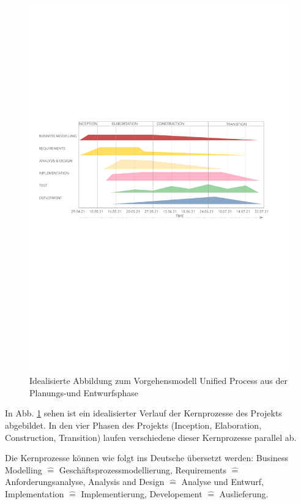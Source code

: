 \documentclass[../review_3.tex]{subfiles}
\begin{document}
\begin{figure} [h]
    \centering
    \includegraphics[width = \linewidth]{img/UnifiedProcess.pdf}
    \caption{Idealisierte Abbildung zum Vorgehensmodell Unified Process aus der Planungs-und Entwurfsphase}
    \label{up}
\end{figure}

In Abb. \ref{up} sehen ist ein idealisierter Verlauf der Kernprozesse des Projekts abgebildet. In den vier Phasen des Projekts (Inception, Elaboration, Construction, Transition) laufen verschiedene dieser Kernprozesse parallel ab.

Die Kernprozesse können wie folgt ins Deutsche übersetzt werden: Business Modelling $\widehat{=}$ Geschäftsprozessmodellierung, Requirements $\widehat{=}$ Anforderungsanalyse, Analysis and Design $\widehat{=}$ Analyse und Entwurf, Implementation $\widehat{=}$ Implementierung, Developement $\widehat{=}$ Auslieferung.
\end{document}
